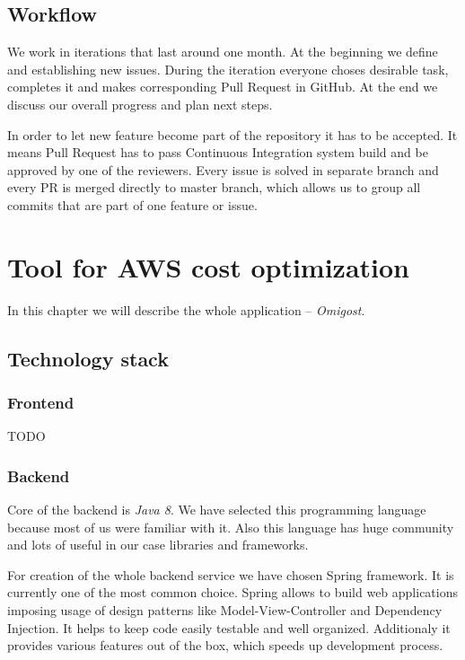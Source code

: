 \documentclass[licencjacka,en]{thesisclass}
\begin{document}
    \section{Workflow}

    We work in iterations that last around one month. At the beginning we define and establishing new issues. During the iteration everyone choses desirable task, completes it and makes corresponding Pull Request in GitHub. At the end we discuss our overall progress and plan next steps.

    In order to let new feature become part of the repository it has to be accepted. It means Pull Request has to pass Continuous Integration system build and be approved by one of the reviewers.
    Every issue is solved in separate branch and every PR is merged directly to master branch, which allows us to group all commits that are part of one feature or issue.


    \chapter{Tool for AWS cost optimization}

    In this chapter we will describe the whole application -- \textit{Omigost}.

    \section{Technology stack}

    \subsection{Frontend}

    TODO

    \subsection{Backend}

    Core of the backend is \textit{Java 8}. We have selected this programming language because most of us were familiar with it. Also this language has huge community and lots of useful in our case libraries and frameworks.

    For creation of the whole backend service we have chosen Spring framework. It is currently one of the most common choice. Spring allows to build web applications imposing usage of design patterns like Model-View-Controller and Dependency Injection. It helps to keep code easily testable and well organized. Additionaly it provides various features out of the box, which speeds up development process.
\end{document}
